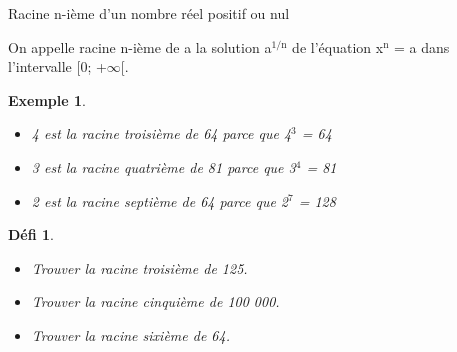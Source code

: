 \documentclass[presentation]{beamer}
\newtheorem{defi}{Défi}[section]
\newtheorem{exe}{Exemple}[section]
\begin{document}
\begin{frame}[label={sec:org9700504}]{Racine n-ième d'un nombre réel positif ou nul}
\begin{definition}
On appelle \alert{racine n-ième de a} la solution a\(^{\text{1/n}}\) de l'équation
x\(^{\text{n}}\) = a dans l'intervalle [0; +\(\infty\)[.
\end{definition}

\begin{exe}
\begin{itemize}
\item 4 est la racine troisième de 64 parce que 4\(^{\text{3}}\) = 64
\item 3 est la racine quatrième de 81 parce que 3\(^{\text{4}}\) = 81
\item 2 est la racine septième de 64 parce que 2\(^{\text{7}}\) = 128
\end{itemize}
\end{exe}

\begin{defi}
\begin{itemize}
\item Trouver la racine troisième de 125.
\item Trouver la racine cinquième de 100 000.
\item Trouver la racine sixième de 64.
\end{itemize}
\end{defi}
\end{frame}
\end{document}
